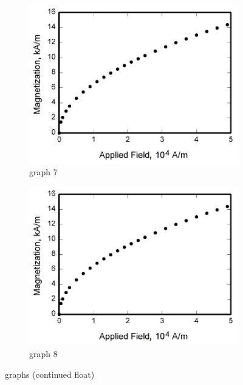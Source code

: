 \begin{figure}[H]\ContinuedFloat
    \begin{subfigure}[t]{0.48\textwidth}
        \centering
        \includegraphics[width=1.0\textwidth]{Images/graph.jpg}
        \caption{graph 7}
        \label{subfig:graph7}
    \end{subfigure}
    \hfill
    \begin{subfigure}[t]{0.48\textwidth}
        \centering
        \includegraphics[width=1.0\textwidth]{Images/graph.jpg}
        \caption{graph 8}
        \label{subfig:graph8}
    \end{subfigure}
    \caption{graphs (continued float)}
    \label{fig:graph_contfloat}
\end{figure}